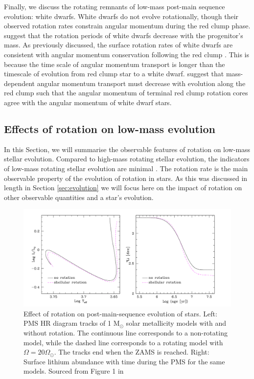 Finally, we discuss the rotating remnants of low-mass post-main sequence evolution: white dwarfs.
White dwarfs do not evolve rotationally, though their observed rotation rates constrain angular momentum during the red clump phase.
\citet{hermes_white_2017} suggest that the rotation periods of white dwarfs decrease with the progenitor's mass.
As previously discussed, the surface rotation rates of white dwarfs are consistent with angular momentum conservation following the red clump \citep{den_hartogh_constraining_2019, cantiello_angular_2014}.
This is because the time scale of angular momentum transport is longer than the timescale of evolution from red clump star to a white dwarf.
\citet{den_hartogh_constraining_2019} suggest that mass-dependent angular momentum transport must decrease with evolution along the red clump such that the angular momentum of terminal red clump rotation cores agree with the angular momentum of white dwarf stars.

\subsection{Effects of rotation on low-mass evolution}
\label{sec:effects}

In this Section, we will summarise the observable features of rotation on low-mass stellar evolution.
Compared to high-mass rotating stellar evolution, the indicators of low-mass rotating stellar evolution are minimal \citep[see, e.g.,][]{heger_presupernova_2000, maeder_evolution_2000}.
The rotation rate is the main observable property of the evolution of rotation in stars.
As this was discussed in length in Section \ref{sec:evolution} we will focus here on the impact of rotation on other observable quantities and a star's evolution.

\begin{figure}[h]
    \includegraphics[width=\textwidth]{Figures/intro_figures/PMS_effect.png}
    \caption[Effect of rotation on pre-main-sequence evolution of a 1 $M_{\odot}$ star.]{Effect of rotation on post-main-sequence evolution of stars. Left: PMS HR diagram tracks of 1 M$_{\odot}$ solar metallicity models with and without rotation. The continuous line corresponds to a non-rotating model, while the dashed line corresponds to a rotating model with $\Omega = 20 \Omega_{\odot}$. The tracks end when the ZAMS is reached. Right: Surface lithium abundance with time during the PMS for the same models. Sourced from Figure 1 in \citet{eggenberger_rotation_2013}}
    \label{fig:pms_effect}
\end{figure}

